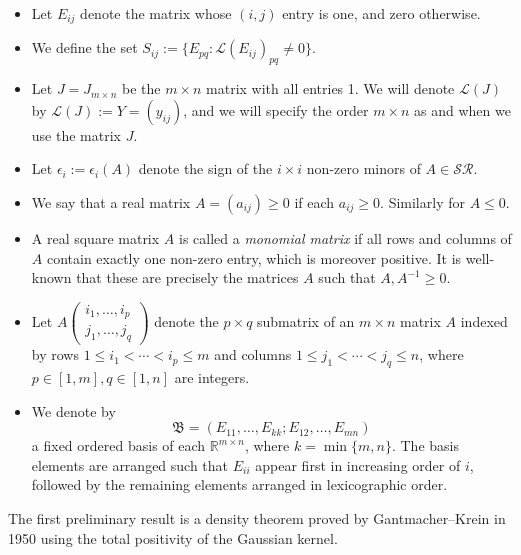\documentclass[11pt,reqno]{amsart}
\theoremstyle{plain}
\theoremstyle{definition}
\numberwithin{equation}{section}
\begin{document}
\begin{itemize}
	\item[(i)] Let $E_{ij}$ denote the matrix whose $(i,j)$ entry is one, and zero otherwise.
	
	\item[(ii)] We define the set $S_{ij}:=\{E_{pq}:\mathcal{L}(E_{ij})_{pq}\neq0\}$.
	
	\item[(iii)] Let $J=J_{m \times n}$ be the $m \times n$ matrix with all entries 1. We will denote $\mathcal{L}(J)$ by $\mathcal{L}(J):=Y=(y_{ij})$, and we will specify the order $m\times n$ as and when we use the matrix $J$.
	
	\item[(iv)] Let $\epsilon_i:=\epsilon_i(A)$ denote the sign of the $i\times i$ non-zero minors of $A\in\mathcal{SR}$.
	
	\item[(v)] We say that a real matrix $A = (a_{ij}) \geq 0$ if each $a_{ij} \geq 0$. Similarly for $A \leq 0$.
	
	\item[(vi)] A real square matrix $A$ is called a \textit{monomial matrix} if all rows and columns of $A$ contain exactly one non-zero entry, which is moreover positive. It is well-known that these are precisely the matrices $A$ such that $A, A^{-1} \geq 0$.
	
	\item[(vii)] Let $A\begin{pmatrix}
		i_1,\ldots,i_p \\
		j_1,\ldots,j_q
	\end{pmatrix}$ denote the $p\times q$ submatrix of an
	$m\times n$ matrix $A$ indexed by rows $1\leq i_1<\cdots<i_p\leq m$ and columns $1\leq j_1<\cdots<j_q\leq n$, where $p\in [1, m], q\in[1,n]$ are integers.
	
	\item[(viii)] We denote by
		\begin{equation}\label{basis}
		\mathfrak{B}=(E_{11},\ldots,E_{kk};E_{12},\ldots,E_{mn})
		\end{equation} a fixed ordered basis of each $\mathbb{R}^{m\times n}$, where $k=\min\{m,n\}$. The basis elements are arranged such that $E_{ii}$ appear first in increasing order of $i$, followed by the remaining elements arranged in lexicographic order.
\end{itemize}
The first preliminary result is a density theorem proved by Gantmacher--Krein in 1950 using the total positivity of the Gaussian kernel.
\end{document}
